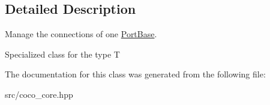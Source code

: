 \subsection{Detailed Description}
Manage the connections of one \hyperlink{classcoco_1_1_port_base}{Port\+Base}. 

Specialized class for the type T 

The documentation for this class was generated from the following file\+:\begin{DoxyCompactItemize}
\item 
src/coco\+\_\+core.\+hpp\end{DoxyCompactItemize}
